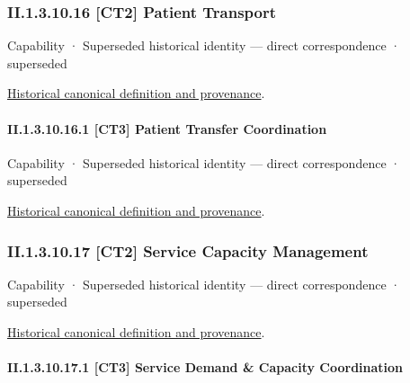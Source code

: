 \subsubsection*{II.1.3.10.16 [CT2] Patient Transport}
\label{navigation:II.1.3.10.16}

\label{element:e9c1a897884f4d758f5654b824364030}
{\small Capability · Superseded historical identity — direct correspondence · superseded}\par
\href{../../../../continuum/strategy/capability/e9c1a897884f4d758f5654b824364030.md}{Historical canonical definition and provenance}.\par
\paragraph*{II.1.3.10.16.1 [CT3] Patient Transfer Coordination}
\label{navigation:II.1.3.10.16.1}

\label{element:b5a76d4877424b2ea9b01fb5fa22772c}
{\small Capability · Superseded historical identity — direct correspondence · superseded}\par
\href{../../../../continuum/strategy/capability/b5a76d4877424b2ea9b01fb5fa22772c.md}{Historical canonical definition and provenance}.\par
\subsubsection*{II.1.3.10.17 [CT2] Service Capacity Management}
\label{navigation:II.1.3.10.17}

\label{element:ac205f374c9d41c3b6d18a6b7c356152}
{\small Capability · Superseded historical identity — direct correspondence · superseded}\par
\href{../../../../continuum/strategy/capability/ac205f374c9d41c3b6d18a6b7c356152.md}{Historical canonical definition and provenance}.\par
\paragraph*{II.1.3.10.17.1 [CT3] Service Demand \& Capacity Coordination}
\label{navigation:II.1.3.10.17.1}

